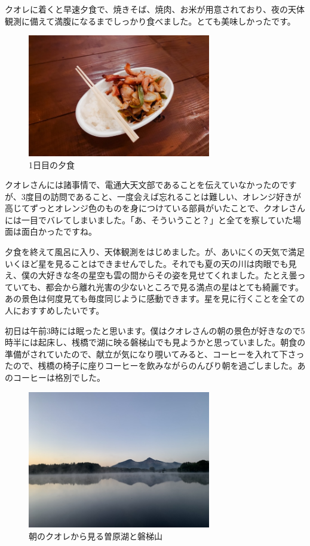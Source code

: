 \documentclass[../main]{subfiles}
\begin{document}
クオレに着くと早速夕食で、焼きそば、焼肉、お米が用意されており、夜の天体観測に備えて満腹になるまでしっかり食べました。とても美味しかったです。
\begin{figure}[H]
\includegraphics[width=8cm]{sections/Nakahara/IMG_8502.jpg}
\centering
\caption{1日目の夕食}
\end{figure}

クオレさんには諸事情で、電通大天文部であることを伝えていなかったのですが、3度目の訪問であること、一度会えば忘れることは難しい、オレンジ好きが高じてずっとオレンジ色のものを身につけている部員がいたことで、クオレさんには一目でバレてしまいました。「あ、そういうこと？」と全てを察していた場面は面白かったですね。

夕食を終えて風呂に入り、天体観測をはじめました。が、あいにくの天気で満足いくほど星を見ることはできませんでした。それでも夏の天の川は肉眼でも見え、僕の大好きな冬の星空も雲の間からその姿を見せてくれました。たとえ曇っていても、都会から離れ光害の少ないところで見る満点の星はとても綺麗です。あの景色は何度見ても毎度同じように感動できます。星を見に行くことを全ての人におすすめしたいです。

初日は午前3時には眠ったと思います。僕はクオレさんの朝の景色が好きなので5時半には起床し、桟橋で湖に映る磐梯山でも見ようかと思っていました。朝食の準備がされていたので、献立が気になり覗いてみると、コーヒーを入れて下さったので、桟橋の椅子に座りコーヒーを飲みながらのんびり朝を過ごしました。あのコーヒーは格別でした。

\begin{figure}[H]
\centering
\includegraphics[width=8cm]{sections/Nakahara/IMG_2643.jpeg}
\caption{朝のクオレから見る曽原湖と磐梯山}
\centering
\end{figure}
\end{document}
